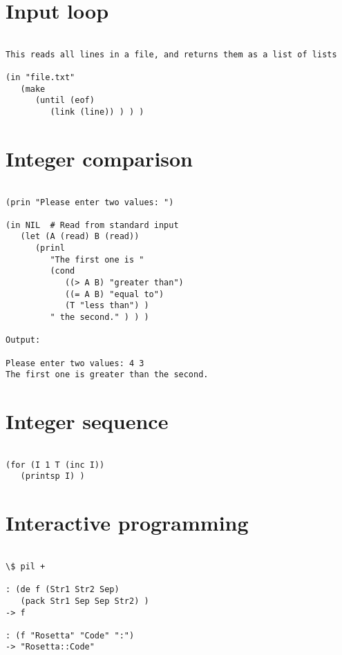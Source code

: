 \section*{Input loop}

\begin{verbatim}

This reads all lines in a file, and returns them as a list of lists

(in "file.txt"
   (make
      (until (eof)
         (link (line)) ) ) )

\end{verbatim}

\section*{Integer comparison}

\begin{verbatim}

(prin "Please enter two values: ")

(in NIL  # Read from standard input
   (let (A (read) B (read))
      (prinl
         "The first one is "
         (cond
            ((> A B) "greater than")
            ((= A B) "equal to")
            (T "less than") )
         " the second." ) ) )

Output:

Please enter two values: 4 3
The first one is greater than the second.

\end{verbatim}

\section*{Integer sequence}

\begin{verbatim}

(for (I 1 T (inc I))
   (printsp I) )

\end{verbatim}

\section*{Interactive programming}

\begin{verbatim}

\$ pil +

: (de f (Str1 Str2 Sep)
   (pack Str1 Sep Sep Str2) )
-> f

: (f "Rosetta" "Code" ":")
-> "Rosetta::Code"

\end{verbatim}

